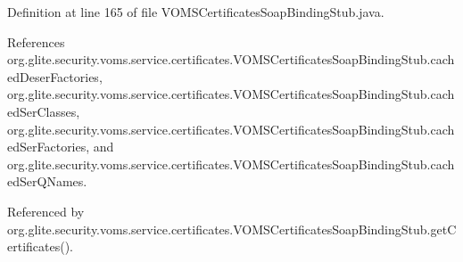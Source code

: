 Definition at line 165 of file VOMSCertificatesSoapBindingStub.java.



References org.glite.security.voms.service.certificates.VOMSCertificatesSoapBindingStub.cachedDeserFactories, org.glite.security.voms.service.certificates.VOMSCertificatesSoapBindingStub.cachedSerClasses, org.glite.security.voms.service.certificates.VOMSCertificatesSoapBindingStub.cachedSerFactories, and org.glite.security.voms.service.certificates.VOMSCertificatesSoapBindingStub.cachedSerQNames.



Referenced by org.glite.security.voms.service.certificates.VOMSCertificatesSoapBindingStub.getCertificates().


\begin{DoxyCode}
                                                                                 

\end{DoxyCode}
